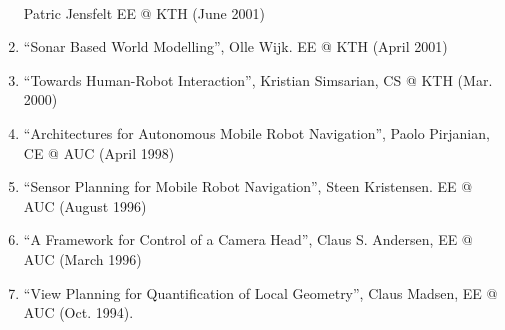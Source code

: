 \documentclass{article}
\begin{document}
\begin{cv}
\begin{cvlist}{~}
\begin{enumerate}
          Patric Jensfelt EE @ KTH (June 2001)
    \item ``Sonar Based World Modelling'', Olle Wijk. EE @ KTH (April 2001)
    \item ``Towards Human-Robot Interaction'', Kristian Simsarian, CS @ KTH
          (Mar. 2000)
    \item ``Architectures for Autonomous Mobile Robot Navigation'', Paolo
          Pirjanian, CE @ AUC (April 1998)
    \item ``Sensor Planning for Mobile Robot Navigation'', Steen Kristensen. EE
          @ AUC (August 1996)
    \item ``A Framework for Control of a Camera Head'', Claus S. Andersen, EE @
          AUC (March 1996)
    \item ``View Planning for Quantification of Local Geometry'', Claus Madsen,
          EE @ AUC (Oct. 1994).
  \end{enumerate}


\end{cvlist}
\end{cv}
\end{document}
